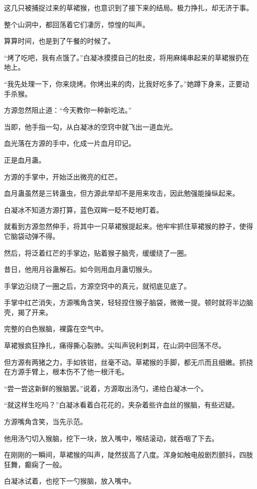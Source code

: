 \begin{this_body}
这几只被捕捉过来的草裙猴，也意识到了接下来的结局。极力挣扎，却无济于事。

整个山洞中，都回荡着它们凄厉，惊惶的叫声。

算算时间，也是到了午餐的时候了。

“烤了吃吧，我有点饿了。”白凝冰摸摸自己的肚皮，将用麻绳串起来的草裙猴扔在地上。

“我先处理一下，你来烧烤。你烤出来的肉，比我好吃多了。”她蹲下身来，正要动手杀猴。

方源忽然阻止道：“今天教你一种新吃法。”

当即，他手指一勾，从白凝冰的空窍中就飞出一道血光。

血光落在方源的手中，化成一片血月印记。

正是血月蛊。

方源的手掌中，开始泛出微亮的红芒。

血月蛊虽然是三转蛊虫，但方源此举却不是用来攻击，因此勉强能操纵起来。

白凝冰不知道方源打算，蓝色双眸一眨不眨地盯着。

就看到方源忽然伸手，将其中一只草裙猴提起来。他牢牢抓住草裙猴的脖子，使得它脑袋动弹不得。

然后，将泛着红芒的手掌边，贴着猴子脑壳，缓缓绕了一圈。

昔日，他用月谷蛊解石。如今则用血月蛊切猴头。

手掌边沿绕了一圈之后，方源空窍中的真元，就彻底见底了。

手掌中红芒消失，方源嘴角含笑，轻轻捏住猴子脑袋，微微一提。顿时就将半边脑壳，揭了开来。

完整的白色猴脑，裸露在空气中。

草裙猴疯狂挣扎，痛得撕心裂肺。尖叫声锐利刺耳，在山洞中回荡不尽。

但方源有两猪之力，手如铁钳，丝毫不动。草裙猴的手脚，都无爪而且细嫩。抓挠在方源手臂上，根本伤不了他一根汗毛。

“尝一尝这新鲜的猴脑罢。”说着，方源取出汤勺，递给白凝冰一个。

“就这样生吃吗？”白凝冰看着白花花的，夹杂着些许血丝的猴脑，有些迟疑。

方源嘴角含笑，当先示范。

他用汤勺切入猴脑，挖下一块，放入嘴中，喉结滚动，就吞咽了下去。

在刚刚的一瞬间，草裙猴的叫声，陡然拔高了八度。浑身如触电般剧烈颤抖，四肢狂舞，癫痫了一般。

白凝冰试着，也挖下一勺猴脑，放入嘴中。


\end{this_body}

